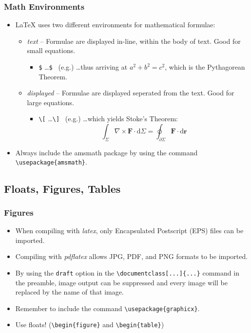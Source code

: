 \documentclass{beamer}
\begin{document}
\begin{frame}[containsverbatim]
    \frametitle{Math Environments}
    \begin{itemize}
        \item \LaTeX { uses} two different environments for mathematical formulae:
        \begin{itemize}
            \item \emph{text} -- Formulae are displayed in-line, within the body of text. Good for small equations.
            \begin{itemize}
                \item \verb|$| \ldots \verb|$| \, (e.g.) \ldots thus arriving at \begin{math} a^2 + b^2 = c^2 \end{math}, which is the Pythagorean Theorem.
            \end{itemize}
            \item \emph{displayed} -- Formulae are displayed seperated from the text. Good for large equations.
            \begin{itemize}
            \item \verb|\[| \ldots \verb|\]| \, (e.g.) \ldots which yields Stoke's Theorem: \begin{equation} \int_\Sigma \nabla \times \mathbf{F} \cdot \mathrm{d}\Sigma = \oint_{\partial\Sigma} \mathbf{F} \cdot \mathrm{d}\mathbf{r} \end{equation}
            \end{itemize}
        \end{itemize}
    \item Always include the amsmath package by using the command \verb|\usepackage{amsmath}|.
    \end{itemize}
\end{frame}

\subsection{Floats, Figures, Tables}

\begin{frame}[containsverbatim]
    \frametitle{Figures}
        \begin{itemize}
        \item When compiling with \emph{latex}, only Encapsulated Postscript (EPS) files can be imported.
        \item Compiling with \emph{pdflatex} allows JPG, PDF, and PNG formats to be imported.
        \item By using the \verb|draft| option in the \verb|\documentclass[...]{...}| command in the preamble, image output can be suppressed and every image will be replaced by the name of that image.
        \item Remember to include the command \verb|\usepackage{graphicx}|.
        \item Use floats! (\verb|\begin{figure}| and \verb|\begin{table}|)
    \end{itemize}
\end{frame}
\end{document}
